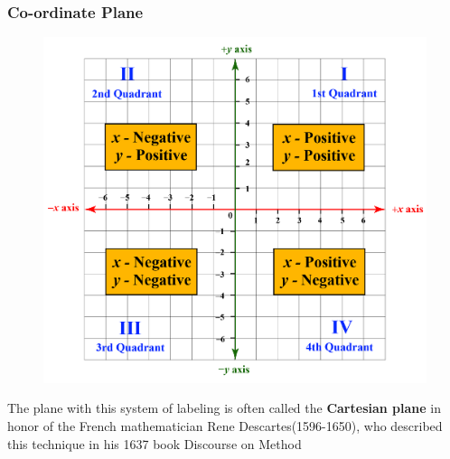\documentclass{beamer}
\begin{document}
\begin{frame}
  \frametitle{Co-ordinate Plane}
  \begin{figure}[h]    
      \centering
      \includegraphics[scale=0.23]{cartesian.png}
\end{figure}
The plane with this system of labeling is often called the \textbf{Cartesian plane} in honor of the French mathematician Rene Descartes(1596-1650), who described this technique in his 1637 book Discourse on Method
\end{frame}


  
\end{document}
